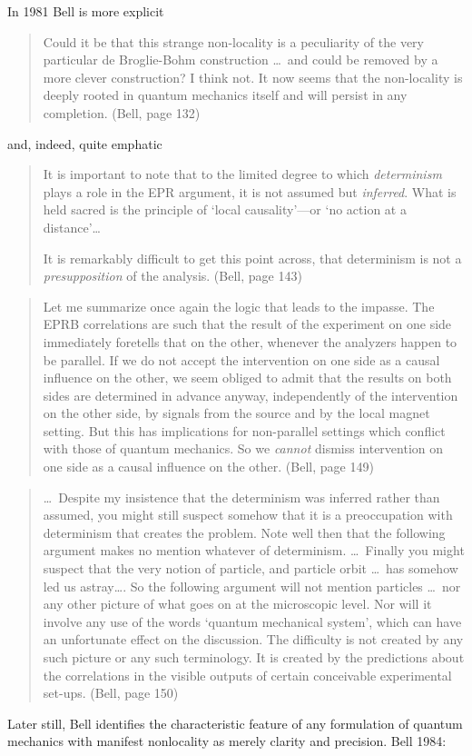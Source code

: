 \documentclass[12pt]{article}
\newcommand\bq{\begin{quotation}}
\newcommand\eq{\end{quotation}}
\begin{document}
In 1981 Bell is more explicit
\bq
Could it be that this strange non-locality is a peculiarity of the very
particular de Broglie-Bohm construction \dots\  and could be removed by a more
clever construction? I think not. It now seems that the  non-locality is
deeply rooted in quantum mechanics itself and will persist in any
completion. (Bell, page 132)
\eq
and, indeed, quite emphatic
\bq It is important to note that to the limited degree to which {\it
determinism\/} plays a role in the EPR argument, it is not assumed but
{\it inferred\/}. What is held sacred is the principle of `local
causality'---or `no action at a distance'\dots

It is remarkably difficult to get this point across, that determinism is
not a {\it presupposition\/} of the analysis. (Bell, page 143)
\eq
\bq Let me summarize once again the logic that leads to the impasse. The
EPRB correlations are such that the result of the experiment on one side
immediately foretells that on the other, whenever the analyzers happen to
be parallel. If we do not accept the intervention on one side as a causal
influence on the other, we seem obliged to admit that the results on both
sides are determined in advance anyway, independently of the intervention
on the other side, by signals from the source and by the local magnet
setting. But this has implications for non-parallel settings which conflict
with those of quantum mechanics. So we {\it cannot\/} dismiss intervention
on one side as a causal influence on the other. (Bell, page 149)
\eq
\bq  \dots\  Despite my insistence that the determinism was inferred
rather than assumed, you might still suspect somehow that it is a
preoccupation with determinism that creates the problem. Note well then
that the following argument makes no mention whatever of determinism. \dots\
Finally you might suspect that the very notion of particle, and particle
orbit \dots\  has somehow led us astray\dots. So the following argument
will not
mention particles \dots\  nor any other picture of what goes on at the
microscopic level. Nor will it involve any use of the words `quantum
mechanical system', which can have an unfortunate effect on the discussion.
The difficulty is not created by any such picture or any such terminology.
It is created by the predictions about the correlations in the visible
outputs of certain conceivable experimental set-ups. (Bell, page 150)
\eq

Later still,  Bell identifies the characteristic  feature of any formulation of
quantum mechanics with  manifest nonlocality  as merely
clarity and precision. Bell 1984:
\end{document}
